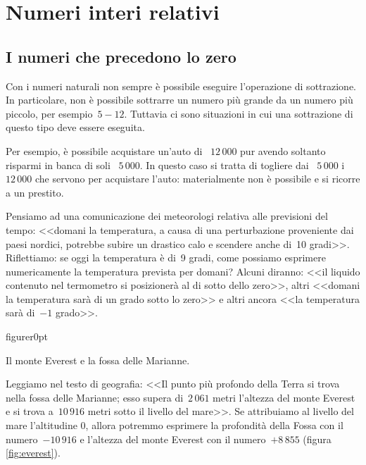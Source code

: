\chapter{Numeri interi relativi}
\section{I numeri che precedono lo zero}

Con i numeri naturali non sempre è possibile eseguire l'operazione di sottrazione. In particolare,
non è possibile sottrarre un numero più grande da un numero più piccolo, per esempio~$5-12$. Tuttavia
ci sono situazioni in cui una sottrazione di questo tipo deve essere eseguita.

Per esempio, è possibile acquistare un'auto di \officialeuro~$12\,000$ pur avendo soltanto risparmi in banca di soli
\officialeuro~$5\,000$. In questo caso si tratta di togliere dai \officialeuro~$5\,000$ i \officialeuro~$12\,000$ che servono per acquistare
l'auto: materialmente non è possibile e si ricorre a un prestito.

Pensiamo ad una comunicazione dei meteorologi relativa alle previsioni del tempo: <<domani la temperatura,
a causa di una perturbazione proveniente dai paesi nordici, potrebbe subire un drastico calo e scendere anche di~10 gradi>>. Riflettiamo: se oggi la temperatura è di~9 gradi, come possiamo esprimere numericamente la temperatura
prevista per domani? Alcuni diranno: <<il liquido contenuto nel termometro si posizionerà al di sotto dello zero>>,
altri <<domani la temperatura sarà di un grado sotto lo zero>> e
altri ancora <<la temperatura sarà di~$-1$ grado>>.

\begin{wrapfloat}{figure}{r}{0pt}
 
 \caption{Il monte Everest e la fossa delle Marianne.}
 \label{fig:everest}
\end{wrapfloat}

Leggiamo nel testo di geografia: <<Il punto più profondo della Terra si trova nella fossa delle Marianne; esso
supera di~$2\,061$ metri l'altezza del monte Everest e si trova a~$10\,916$ metri sotto il livello del mare>>.
Se attribuiamo al livello del mare l'altitudine 0, allora potremmo esprimere la profondità della Fossa con il
numero~$-10\,916$ e l'altezza del monte Everest con il numero~$+8\,855$ (figura \ref{fig:everest}).

